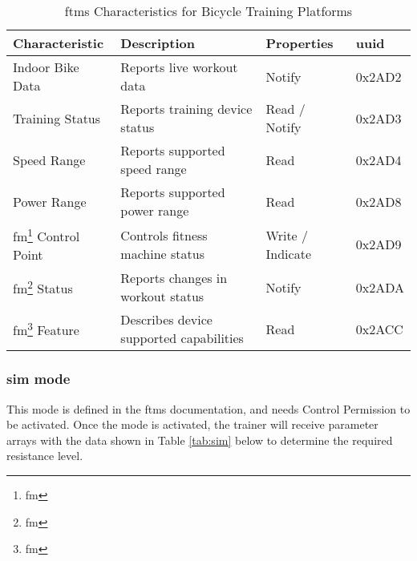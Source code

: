 \begin{table}[H]
	\renewcommand{\arraystretch}{\tablestretch}
	\centering
	\caption{\ac{ftms} Characteristics for Bicycle Training Platforms}
	\citep{Huawei:2022}
	\begin{tabularx}{\textwidth}{>{\raggedright}p{3cm} >{\raggedright}X >{\raggedright}p{2.3cm} p{1.3cm}}
		\toprule
		Characteristic                               & Description                             & Properties       & \acs{uuid} \\
		\midrule
		Indoor Bike Data                             & Reports live workout data               & Notify           & 0x2AD2     \\
		Training Status                              & Reports training device status          & Read / Notify    & 0x2AD3     \\
		Speed Range                                  & Reports supported speed range           & Read             & 0x2AD4     \\
		Power Range                                  & Reports supported power range           & Read             & 0x2AD8     \\
		\acs{fm}\footnote[1]{\acf{fm}} Control Point & Controls fitness machine status         & Write / Indicate & 0x2AD9     \\
		\acs{fm}\footnote[1]{\acf{fm}} Status        & Reports changes in workout status       & Notify           & 0x2ADA     \\
		\acs{fm}\footnote[1]{\acf{fm}} Feature       & Describes device supported capabilities & Read             & 0x2ACC     \\
		\bottomrule
	\end{tabularx}
	\label{tab:ftmsft}
\end{table}

\vspace{-0.5 cm}

\subsubsection{\ac{sim} mode}
\label{sec:sim}

\color{red}

This mode is defined in the \ac{ftms} documentation, and needs Control Permission to be activated. Once the mode is activated, the trainer will receive parameter arrays with the data shown in Table \ref{tab:sim} below to determine the required resistance level.

